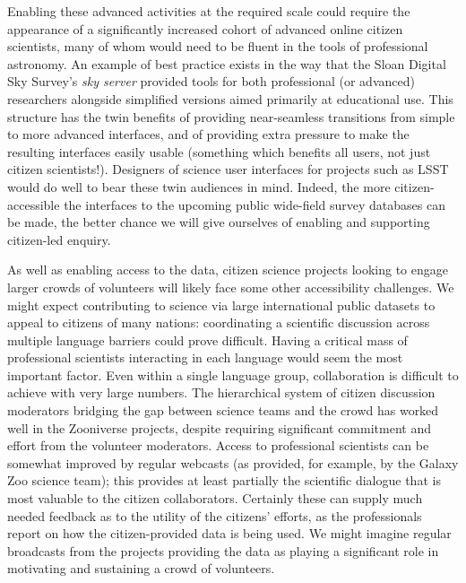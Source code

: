 \documentclass{ar2e}
\begin{document}
Enabling these advanced activities at the required scale could require the
appearance of a significantly increased cohort of advanced online citizen
scientists, many of whom would need to be fluent in the tools of professional
astronomy. An example of best practice exists in the way that the Sloan Digital
Sky Survey's \emph{sky server} provided tools for both professional (or
advanced) researchers alongside simplified versions aimed primarily at
educational use. This structure has the twin benefits of providing near-seamless
transitions from simple to more advanced interfaces, and of providing extra
pressure to make the resulting interfaces easily usable  (something which
benefits all users, not just citizen scientists!). Designers of science user
interfaces for projects such as LSST would do well to bear these twin audiences
in mind. Indeed, the more citizen-accessible the interfaces to the upcoming
public wide-field survey databases can be made, the better chance we will give
ourselves of enabling and supporting citizen-led enquiry.  

 


As well as enabling access to the data, citizen science projects looking to
engage larger crowds of volunteers will likely face some other accessibility
challenges. We might expect contributing to science via large international
public datasets to appeal to citizens of many nations: coordinating a scientific
discussion across multiple language barriers could prove difficult. Having a
critical mass of professional scientists interacting in each language would seem
the most important factor. Even within a single language group, collaboration is
difficult to achieve with  very large numbers. The hierarchical system of
citizen discussion  moderators bridging the gap between science teams and the
crowd has worked well in the Zooniverse projects, despite requiring significant
commitment and effort from the volunteer moderators. Access to professional
scientists can be somewhat improved by regular webcasts (as provided, for
example, by the Galaxy Zoo science team); this provides at least partially the
scientific dialogue that is most valuable to the citizen collaborators.
Certainly these can supply much needed feedback as to the utility of the
citizens' efforts, as the professionals report on how the citizen-provided data
is being used. We might imagine regular broadcasts from the projects providing
the data as playing a significant role in motivating and sustaining a crowd of
volunteers.
\end{document}

